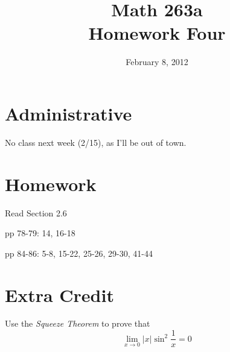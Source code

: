 \documentclass{exam}
\title{Math 263a \\ Homework Four}
\date{February 8, 2012}
\begin{document}
\maketitle

\ifprintanswers
\else
\section{Administrative}
No class next week (2/15), as I'll be out of town.
\fi

\section{Homework}

\begin{itemize*}
  \item Read Section 2.6
  \item pp 78-79: 14, 16-18
  \item pp 84-86: 5-8, 15-22, 25-26, 29-30, 41-44
\end{itemize*}

\section{Extra Credit}


Use the {\em Squeeze Theorem} to prove that 
\[
  \lim_{x \to 0} |x| \sin^2 \frac{1}{x} = 0
\]
\end{document}
